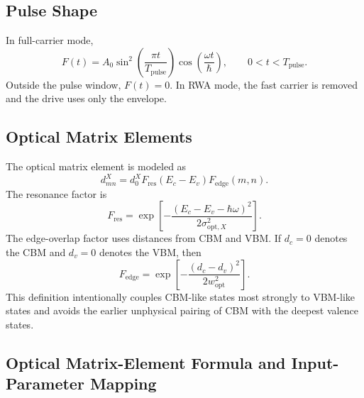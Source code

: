 \documentclass[11pt,a4paper]{article}
\begin{document}
\subsection{Pulse Shape}

In full-carrier mode,
\begin{equation}
F(t)=A_0
\sin^2\left(\frac{\pi t}{T_{\mathrm{pulse}}}\right)
\cos\left(\frac{\omega t}{\hbar}\right),
\qquad
0<t<T_{\mathrm{pulse}}.
\end{equation}
Outside the pulse window, $F(t)=0$.  In RWA mode, the fast carrier is removed and the drive uses only the envelope.

\subsection{Optical Matrix Elements}

The optical matrix element is modeled as
\begin{equation}
d^X_{mn}=d^X_0 F_{\mathrm{res}}(E_c-E_v)F_{\mathrm{edge}}(m,n).
\end{equation}
The resonance factor is
\begin{equation}
F_{\mathrm{res}}=
\exp\left[-\frac{(E_c-E_v-\hbar\omega)^2}{2\sigma_{\mathrm{opt},X}^2}\right].
\end{equation}
The edge-overlap factor uses distances from CBM and VBM.  If $d_c=0$ denotes the CBM and $d_v=0$ denotes the VBM, then
\begin{equation}
F_{\mathrm{edge}}
=
\exp\left[-\frac{(d_c-d_v)^2}{2w_{\mathrm{opt}}^2}\right].
\end{equation}
This definition intentionally couples CBM-like states most strongly to VBM-like states and avoids the earlier unphysical pairing of CBM with the deepest valence states.


\subsection{Optical Matrix-Element Formula and Input-Parameter Mapping}
\end{document}

